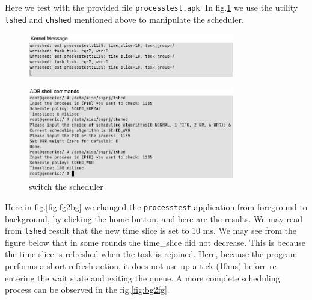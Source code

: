 \documentclass[11pt]{article}
\begin{document}
Here we test with the provided file \texttt{processtest.apk}. In fig.\ref{fig:switch} we use the
utility \texttt{lshed} and \texttt{chshed} mentioned above to manipulate
the scheduler.
\begin{figure}[H]
  \centering
  \includegraphics[width=0.8\textwidth]{.split/change-sched.1.png}
\end{figure}
\begin{figure}[H]\ContinuedFloat
  \centering
  \includegraphics[width=0.8\textwidth]{.split/change-sched.2.png}
  \caption{switch the scheduler}\label{fig:switch}%
\end{figure}


Here in fig.\ref{fig:fg2bg} we changed the \texttt{processtest} application from foreground to
background, by clicking the home button, and here are the results. We
may read from \texttt{lshed} result that the new time slice is set to 10
ms. We may see from the figure below that in some rounds the time\_slice
did not decrease. This is because the time slice is refreshed when the
task is rejoined. Here, because the program performs a short refresh
action, it does not use up a tick (10ms) before re-entering the wait
state and exiting the queue. A more complete scheduling process can be
observed in the fig.\ref{fig:bg2fg}.
\end{document}

